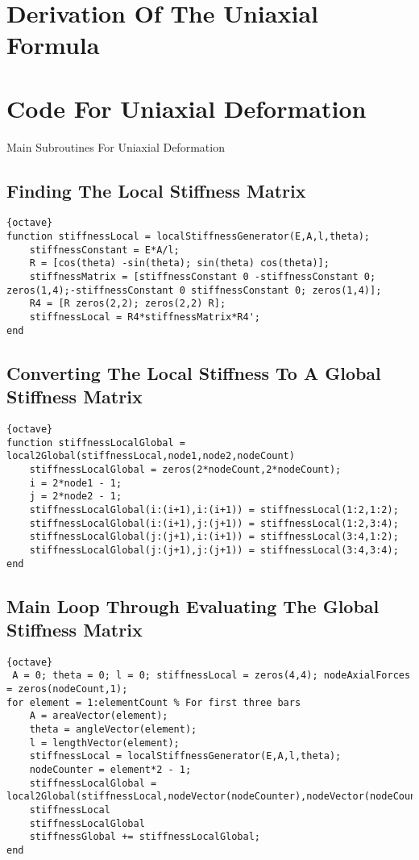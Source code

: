 \documentclass{report}
\begin{document}
\section{Derivation Of The Uniaxial Formula}

\section{Code For Uniaxial Deformation} %


\label{sec:for_uniaxial_deformation}
Main Subroutines For Uniaxial Deformation
\subsection{Finding The Local Stiffness Matrix} %
\begin{lstlisting}{octave}
function stiffnessLocal = localStiffnessGenerator(E,A,l,theta);
    stiffnessConstant = E*A/l;
    R = [cos(theta) -sin(theta); sin(theta) cos(theta)];
    stiffnessMatrix = [stiffnessConstant 0 -stiffnessConstant 0; zeros(1,4);-stiffnessConstant 0 stiffnessConstant 0; zeros(1,4)];
    R4 = [R zeros(2,2); zeros(2,2) R];
    stiffnessLocal = R4*stiffnessMatrix*R4';
end
\end{lstlisting}
\label{sec:finding_the_local_stiffness_matrix}
\subsection{Converting The Local Stiffness To A Global Stiffness Matrix}
\begin{lstlisting}{octave}
function stiffnessLocalGlobal = local2Global(stiffnessLocal,node1,node2,nodeCount)
    stiffnessLocalGlobal = zeros(2*nodeCount,2*nodeCount);
    i = 2*node1 - 1;
    j = 2*node2 - 1;
    stiffnessLocalGlobal(i:(i+1),i:(i+1)) = stiffnessLocal(1:2,1:2);
    stiffnessLocalGlobal(i:(i+1),j:(j+1)) = stiffnessLocal(1:2,3:4);
    stiffnessLocalGlobal(j:(j+1),i:(i+1)) = stiffnessLocal(3:4,1:2);
    stiffnessLocalGlobal(j:(j+1),j:(j+1)) = stiffnessLocal(3:4,3:4);
end
\end{lstlisting}
\subsection{Main Loop Through Evaluating The Global Stiffness Matrix}
\begin{lstlisting}{octave}
 A = 0; theta = 0; l = 0; stiffnessLocal = zeros(4,4); nodeAxialForces = zeros(nodeCount,1);
for element = 1:elementCount % For first three bars
    A = areaVector(element);
    theta = angleVector(element);
    l = lengthVector(element);
    stiffnessLocal = localStiffnessGenerator(E,A,l,theta);
    nodeCounter = element*2 - 1;
    stiffnessLocalGlobal = local2Global(stiffnessLocal,nodeVector(nodeCounter),nodeVector(nodeCounter+1),nodeCount);
    stiffnessLocal
    stiffnessLocalGlobal
    stiffnessGlobal += stiffnessLocalGlobal;
end
\end{lstlisting}
\end{document}
